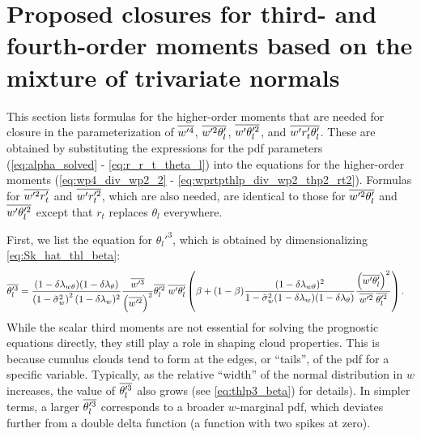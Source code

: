 \section{Proposed closures for third- and fourth-order moments based on the mixture of trivariate normals}
\label{sec:prop_closure}

This section lists formulas for the higher-order moments that are needed for closure
in the parameterization of $\overline{w'^4}$, $\overline{w'^2 \theta_l'}$, $\overline{w' \theta_l'^2}$, and $\overline{w' r_t' \theta_l'}$.
These are obtained by substituting the expressions for the \gls{pdf} parameters
(\cref{eq:alpha_solved} - \cref{eq:r_r_t_theta_l}) into the equations for the higher-order moments
(\cref{eq:wp4_div_wp2_2} - \cref{eq:wprtpthlp_div_wp2_thp2_rt2}).
Formulas for $\overline{w'^2 r_t'}$ and $\overline{w' r_t'^2}$,
which are also needed,
are identical to those for $\overline{w'^2 \theta_l'}$ and $\overline{w' \theta_l'^2}$ except that $r_t$ replaces $\theta_l$ everywhere.

First, we list the equation for $\theta_l'^3$, which is obtained by dimensionalizing \cref{eq:Sk_hat_thl_beta}:
\begin{align}
    \label{eq:thlp3_beta}
    \overline{\theta_l'^3}
    &= \frac{(1-\delta \lambda_{w \theta})(1-\delta \lambda_\theta)}{\left( 1 - \tilde{\sigma}_w^2 \right)^2 (1-\delta \lambda_w)^2}
    \frac{\overline{w'^3}}{\left( \overline{w'^2} \right)^2}
    \overline{\theta_l'^2} \;
    \overline{w'\theta_l'}
    \left(\beta + (1-\beta)
    \frac{(1-\delta \lambda_{w \theta})^2}{1-\tilde{\sigma}_w^2 (1-\delta \lambda_w)(1-\delta \lambda_\theta)}
    \frac{\left(\overline{w'\theta_l'}\right)^2}{\overline{w'^2} \; \overline{\theta_l'^2}}\right).
\end{align}
While the scalar third moments are not essential for solving the prognostic equations directly,
they still play a role in shaping cloud properties.
This is because cumulus clouds tend to form at the edges,
or \enquote{tails}, of the \gls{pdf} for a specific variable.
Typically, as the relative \enquote{width} of the normal distribution in $w$ increases,
the value of $\overline{\theta_l'^3}$ also grows (see \cref{eq:thlp3_beta}) for details).
In simpler terms,
a larger $\overline{\theta_l'^3}$ corresponds to a broader $w$-marginal \gls{pdf},
which deviates further from a double delta function (a function with two spikes at zero).


